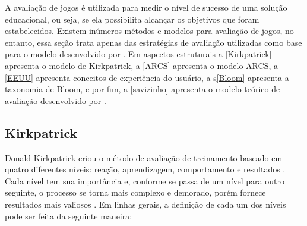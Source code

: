 


A avaliação de jogos é utilizada para medir o nível de sucesso de uma solução educacional, ou seja, se ela possibilita alcançar os objetivos que foram estabelecidos. Existem inúmeros métodos e modelos para avaliação de jogos, no entanto, essa seção trata apenas das estratégias de avaliação utilizadas como base para o modelo desenvolvido por . Em aspectos estruturais a \autoref{Kirkpatrick} apresenta o modelo de Kirkpatrick, a \autoref{ARCS} apresenta o modelo \ac{ARCS}, a \autoref{EEUU} apresenta conceitos de experiência do usuário, a s\autoref{Bloom} apresenta a taxonomia de Bloom, e por fim, a \autoref{savizinho} apresenta o modelo teórico de avaliação desenvolvido por .


\subsection{Kirkpatrick}
\label{Kirkpatrick}

Donald Kirkpatrick criou o método de avaliação de treinamento baseado em quatro diferentes níveis: reação, aprendizagem, comportamento e resultados \cite{donald1994evaluating}. Cada nível tem sua importância e, conforme se passa de um nível para outro seguinte, o processo se torna mais complexo e demorado, porém fornece resultados mais valiosos \cite{chapman2009kirkpatrick}. Em linhas gerais, a definição de cada um dos níveis pode ser feita da seguinte maneira:


